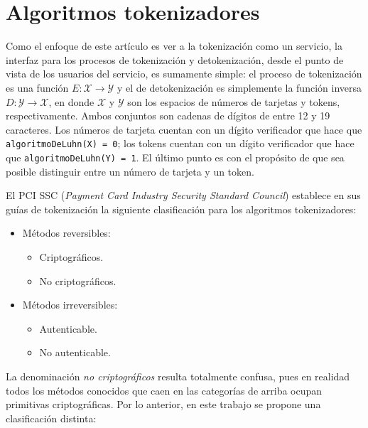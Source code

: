 %
%

\section{Algoritmos tokenizadores}

Como el enfoque de este artículo es ver a la tokenización como un servicio, la
interfaz para los procesos de tokenización y detokenización, desde el punto de
vista de los usuarios del servicio, es sumamente simple: el proceso de
tokenización es una función $ E: \mathcal{X} \rightarrow \mathcal{Y} $ y el de
detokenización es  simplemente la función inversa $ D: \mathcal{Y} \rightarrow
\mathcal{X} $, en donde $ \mathcal{X} $ y $ \mathcal{Y} $ son los espacios de
números de tarjetas y tokens, respectivamente. Ambos conjuntos son cadenas de
dígitos de entre 12 y 19 caracteres. Los números de tarjeta cuentan con un
dígito verificador que hace que \texttt{algoritmoDeLuhn(X) = 0}; los tokens
cuentan con un dígito verificador que hace que \texttt{algoritmoDeLuhn(Y) = 1}.
El último punto es con el propósito de que sea posible distinguir entre un
número de tarjeta y un token.

El PCI SSC (\textit{Payment Card Industry Security Standard Council}) establece
en sus guías de tokenización la siguiente clasificación para los algoritmos
tokenizadores\cite{pci_tokens}:


\begin{itemize}
  \item Métodos reversibles:
  \begin{itemize}
    \item Criptográficos.
    \item No criptográficos.
  \end{itemize}
  \item Métodos irreversibles:
  \begin{itemize}
    \item Autenticable.
    \item No autenticable.
  \end{itemize}
\end{itemize}

La denominación \textit{no criptográficos} resulta totalmente confusa, pues en
realidad todos los métodos conocidos que caen en las categorías de arriba ocupan
primitivas criptográficas. %
Por lo anterior, en este trabajo se propone una clasificación distinta:


